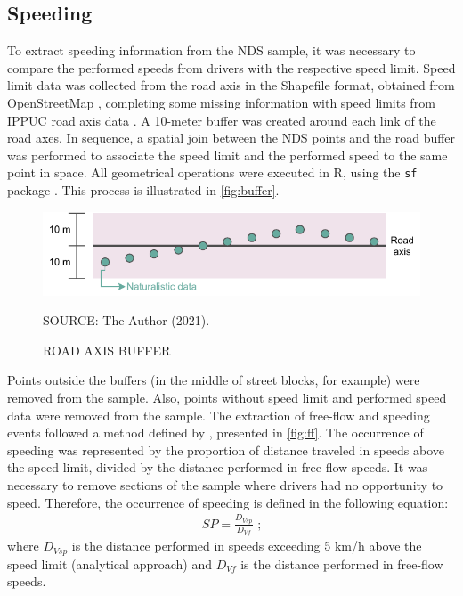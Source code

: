 \subsection{Speeding} \label{sub:spd}





To extract speeding information from the NDS sample, it was necessary to compare the performed speeds from drivers with the respective speed limit. Speed limit data was collected from the road axis in the Shapefile format, obtained from OpenStreetMap \cite{OpenStreetMap}, completing some missing information with speed limits from IPPUC road axis data \cite{IPPUC2021}. A 10-meter buffer was created around each link of the road axes. In sequence, a spatial join between the NDS points and the road buffer was performed to associate the speed limit and the performed speed to the same point in space. All geometrical operations were executed in R, using the \verb|sf| package \cite{pebesma2018}. This process is illustrated in \autoref{fig:buffer}. 

\begin{figure}[!htbp]
    \centering\footnotesize
    \captionsetup{font=footnotesize}
    \caption{ROAD AXIS BUFFER}
    \includegraphics{fig/buffer.pdf}
    \label{fig:buffer}
    \par SOURCE: The Author (2021).
\end{figure}

Points outside the buffers (in the middle of street blocks, for example) were removed from the sample. Also, points without speed limit and performed speed data were removed from the sample. The extraction of free-flow and speeding events followed a method defined by \textcite{Richard2013}, presented in \autoref{fig:ff}. The occurrence of speeding was represented by the proportion of distance traveled in speeds above the speed limit, divided by the distance performed in free-flow speeds. It was necessary to remove sections of the sample where drivers had no opportunity to speed. Therefore, the occurrence of speeding is defined in the following equation: \begin{align}
    SP = \frac{D_{Vsp}}{D_{Vf}} \mbox{ ;} 
    \label{eq:sp}
\end{align} where $D_{Vsp}$ is the distance performed in speeds exceeding 5 km/h above the speed limit (analytical approach) and $D_{Vf}$ is the distance performed in free-flow speeds. 

